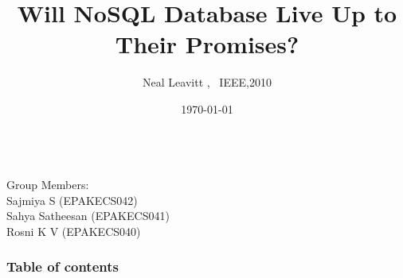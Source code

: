 \documentclass{beamer}
\begin{document}
\title[Sreekrishnapuram]{Will NoSQL Database Live Up to Their Promises?}
\subtitle{Neal Leavitt  , \ IEEE,2010}
\author[Govt. Engineering College]{}
\date{\today} 

\begin{frame}
\titlepage
\end{frame}

\begin{frame}
\\
\medskip 
Group Members:\\
\hspace*{3.5cm}Sajmiya S \hspace*{2.25cm}(EPAKECS042)
\\\hspace*{3.5cm}Sahya Satheesan \hspace*{1.5cm}(EPAKECS041)
\\\hspace*{3.5cm}Rosni K V \hspace*{2.35cm}(EPAKECS040)
\end{frame}

\begin{frame}\frametitle{Table of contents}\tableofcontents
\end{frame}
\end{document}
